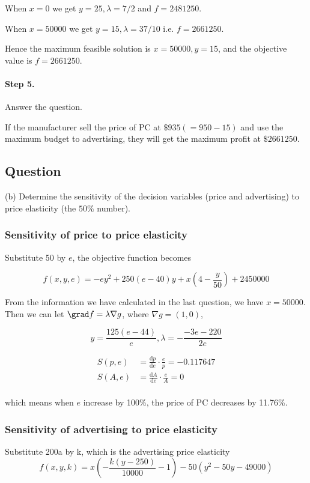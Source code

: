 \documentclass[11pt]{article}
\begin{document}
When $x = 0$ we get $y = 25, \lambda =  7/2$ and $f =2481250$.

When $x = 50000$ we get $y = 15, \lambda =  37/10$ i.e. $f =2661250$.

Hence the maximum feasible solution is $x=50000,y = 15$, and the objective value is $f =2661250$.

\paragraph{Step 5.} Answer the question.

If the manufacturer sell the price of PC at $\$ 935 (=950 - 15)$ and use the maximum budget to advertising, they will get the maximum profit at $\$ 2661250$.

\subsection{Question}


(b) Determine the sensitivity of the decision variables (price and advertising) to price elasticity (the $50 \%$ number).
  
  \subsubsection{Sensitivity of price to price elasticity}
 Substitute 50 by $e$, the objective function becomes
 
 $$
f(x,y,e) = -e y^2+250 (e-40) y+x \left(4-\frac{y}{50}\right)+2450000
$$

From the information we have calculated in the last question, we have $x = 50000$. Then we can let $\grad f = \lambda \nabla g$, where $\nabla g = (1,0)$, 

$$
y= \frac{125 (e-44)}{e},\lambda = -\frac{-3 e-220}{2 e}
$$

$$
\begin{aligned}
	S(p,e )&= \frac{\mathrm d p }{\mathrm d e}\cdot \frac{e}{p} = -0.117647\\
	S(A,e )&= \frac{\mathrm d A }{\mathrm d e}\cdot \frac{e}{A} = 0\\
\end{aligned}
$$
 
which means when $e$ increase by 100\%, the price of PC decreases by 11.76\%.

\subsubsection{Sensitivity of advertising to price elasticity}
Substitute 200a by k, which is the advertising price elasticity
$$
f(x,y,k) = x \left(-\frac{k (y-250)}{10000}-1\right)-50 \left(y^2-50 y-49000\right)
$$
\end{document}
